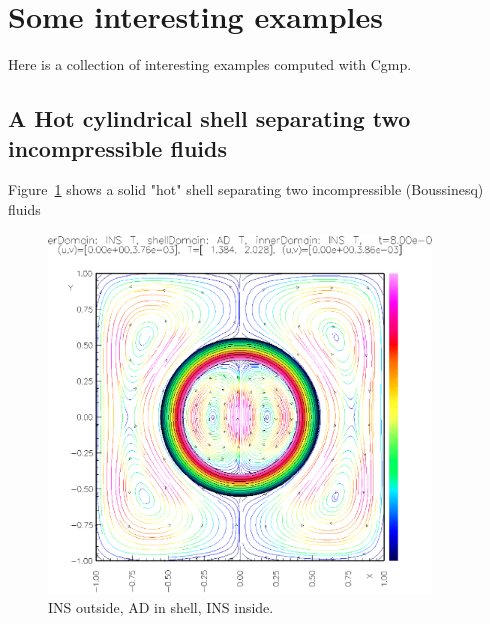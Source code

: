 \section{Some interesting examples}

Here is a collection of interesting examples computed with Cgmp.

\subsection{A Hot cylindrical shell separating two incompressible fluids}

Figure~\ref{fig:cylShell} shows a solid "hot" shell separating two incompressible (Boussinesq) fluids
\begin{figure}
\begin{center}
  \includegraphics[width=4.0in]{cylShellStreamLines.ps}
\end{center}
\caption{INS outside, AD in shell, INS inside.}
\label{fig:cylShell}
\end{figure}


% 
% 
% 



